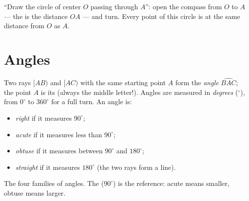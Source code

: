 \begin{example}\label{ex:g6:lines:circle}
``Draw the circle of center $O$ passing through $A$'': open the compass
from $O$ to $A$ --- the  is the distance $OA$ --- and turn. Every
point of this circle is at the same distance from $O$ as $A$.
\end{example}

\section{Angles}

\begin{definition}[Angle]\label{def:g6:lines:angle}
Two rays $[AB)$ and $[AC)$ with the same starting point $A$ form the
\emph{angle} $\widehat{BAC}$; the point $A$ is its
\emph{} (always the middle letter!). Angles are measured in
\emph{degrees} ($^\circ$), from $0^\circ$ to $360^\circ$ for a full
turn. An angle is:
\begin{itemize}
  \item \emph{right} if it measures $90^\circ$;
  \item \emph{acute} if it measures less than $90^\circ$;
  \item \emph{obtuse} if it measures between $90^\circ$ and
        $180^\circ$;
  \item \emph{straight} if it measures $180^\circ$ (the two rays form
        a line).
\end{itemize}
\end{definition}

\begin{omfigure}

{\small The four families of angles. The  ($90^\circ$) is
the reference: acute means smaller, obtuse means larger.}
\end{omfigure}

